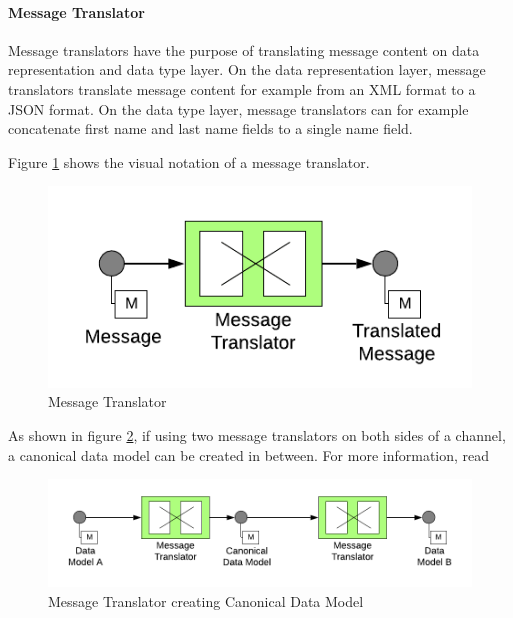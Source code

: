\paragraph{Message Translator}

Message translators have the purpose of translating message content on data representation and data type layer.
On the data representation layer, message translators translate message content for example from an XML format to a JSON format. On the data type layer, message translators can for example concatenate first name and last name fields to a single name field.

Figure \ref{messaging:translator1} shows the visual notation of a message translator.

\begin{figure}[H]
    \centering
    \includegraphics[scale=0.6]{Diagrams/Messaging/6. Message Translator.pdf}
    \caption{Message Translator}
    \label{messaging:translator1}
\end{figure}

As shown in figure \ref{messaging:translator2}, if using two message translators on both sides of a channel, a canonical data model can be created in between. For more information, read \textcite[p. 355]{EIP}

\begin{figure}[H]
    \centering
    \includegraphics[scale=0.6]{Diagrams/Messaging/7. Message Translator.pdf}
    \caption{Message Translator creating Canonical Data Model}
    \label{messaging:translator2}
\end{figure}

